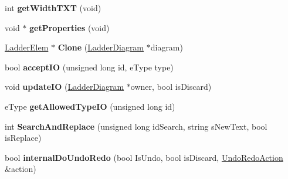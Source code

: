 \begin{DoxyCompactItemize}
\item 
\hypertarget{class_ladder_elem_place_holder_a0fe4f6fbe4257902a50eaf00ced39328}{int {\bfseries get\-Width\-T\-X\-T} (void)}\label{class_ladder_elem_place_holder_a0fe4f6fbe4257902a50eaf00ced39328}

\item 
\hypertarget{class_ladder_elem_place_holder_a3ab5edcb27986e0e79dc980474b5e79c}{void $\ast$ {\bfseries get\-Properties} (void)}\label{class_ladder_elem_place_holder_a3ab5edcb27986e0e79dc980474b5e79c}

\item 
\hypertarget{class_ladder_elem_place_holder_a9219410c442fa7bef7696364e731af06}{\hyperlink{class_ladder_elem}{Ladder\-Elem} $\ast$ {\bfseries Clone} (\hyperlink{class_ladder_diagram}{Ladder\-Diagram} $\ast$diagram)}\label{class_ladder_elem_place_holder_a9219410c442fa7bef7696364e731af06}

\item 
\hypertarget{class_ladder_elem_place_holder_a3395f986177245b6897b8df50a724d4e}{bool {\bfseries accept\-I\-O} (unsigned long id, e\-Type type)}\label{class_ladder_elem_place_holder_a3395f986177245b6897b8df50a724d4e}

\item 
\hypertarget{class_ladder_elem_place_holder_ab7ca23522d2ad1d85563a0f8d41ffe0c}{void {\bfseries update\-I\-O} (\hyperlink{class_ladder_diagram}{Ladder\-Diagram} $\ast$owner, bool is\-Discard)}\label{class_ladder_elem_place_holder_ab7ca23522d2ad1d85563a0f8d41ffe0c}

\item 
\hypertarget{class_ladder_elem_place_holder_a041685dcac53aade9c75f4d65e9f6dff}{e\-Type {\bfseries get\-Allowed\-Type\-I\-O} (unsigned long id)}\label{class_ladder_elem_place_holder_a041685dcac53aade9c75f4d65e9f6dff}

\item 
\hypertarget{class_ladder_elem_place_holder_aebd38e972925cc453322c42798a18d38}{int {\bfseries Search\-And\-Replace} (unsigned long id\-Search, string s\-New\-Text, bool is\-Replace)}\label{class_ladder_elem_place_holder_aebd38e972925cc453322c42798a18d38}

\item 
\hypertarget{class_ladder_elem_place_holder_ac92b6ed69064ef5ee9d641df389d230a}{bool {\bfseries internal\-Do\-Undo\-Redo} (bool Is\-Undo, bool is\-Discard, \hyperlink{struct_undo_redo_action}{Undo\-Redo\-Action} \&action)}\label{class_ladder_elem_place_holder_ac92b6ed69064ef5ee9d641df389d230a}

\end{DoxyCompactItemize}
